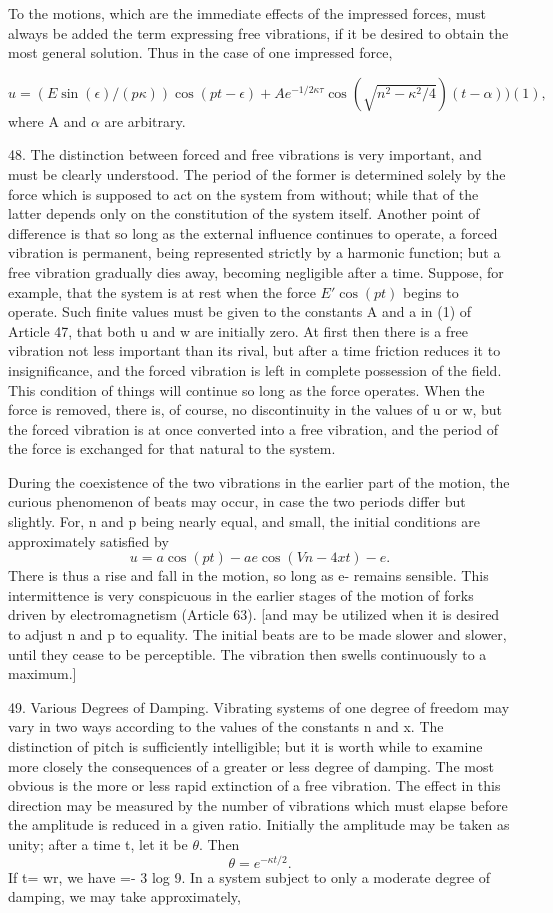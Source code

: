 To the motions, which are the immediate effects of the impressed forces, must
always be added the term expressing free vibrations, if it be desired to obtain
the most general solution. Thus in the case of one impressed force,

\[u = (E \sin(\epsilon ) / (p \kappa )) \cos(pt-\epsilon) + A e^{-1/2 \kappa
\tau } \cos \left( \sqrt{n^2 - \kappa^2/4} \right) (t - \alpha ) ) (1),\]
where A and
\(\alpha\) are arbitrary.

48. The distinction between forced and free vibrations is very important, and
must be clearly understood. The period of the former is determined solely by
the force which is supposed to act on the system from without; while that of
the latter depends only on the constitution of the system itself. Another point
of difference is that so long as the external influence continues to operate, a
forced vibration is permanent, being represented strictly by a harmonic
function; but a free vibration gradually dies away, becoming negligible after a
time.  Suppose, for example, that the system is at rest when the force \(E'
\cos(pt)\) begins to operate. Such finite values must be given to the constants
A and a in (1) of Article 47, that both
 u and w are initially zero. At first
then there is a free vibration not less important than its rival, but after a
time friction reduces it to insignificance, and the forced vibration is left in
complete possession of the field. This condition of things will continue so
long as the force operates. When the force is removed, there is, of course, no
discontinuity in the values of u or w, but the forced vibration is at once
converted into a free vibration, and the period of the force is exchanged for
that natural to the system.

During the coexistence of the two vibrations in the earlier part of the motion,
the curious phenomenon of beats may occur, in case the two periods differ but
slightly. For, n and p being nearly equal, and small, the initial conditions
are approximately satisfied by
\[u=a \cos(pt) -ae \cos(Vn - 4xt) - e.\]
There is thus a rise and fall in the motion, so long as e- remains sensible. This
intermittence is very conspicuous in the earlier stages of the motion of forks
driven by electromagnetism (Article 63).  [and may be utilized when it is
desired to adjust n and p to equality. The initial beats are to be made slower
and slower, until they cease to be perceptible. The vibration then swells
continuously to a maximum.]

49. Various Degrees of Damping.  Vibrating systems of one degree of freedom may
vary in two ways according to the values of the constants n and x. The
distinction of pitch is sufficiently intelligible; but it is worth while to
examine more closely the consequences of a greater or less degree of damping.
The most obvious is the more or less rapid extinction of a free vibration. The
effect in this direction may be measured by the number of vibrations which must
elapse before the amplitude is reduced in a given ratio. Initially the
amplitude may be taken as unity; after a time t, let it be \(\theta\). Then
\[\theta = e^{ - \kappa t/ 2 }.\]
If t= wr, we have =- 3 log 9. In a system
subject to only a moderate degree of damping, we may take approximately,

